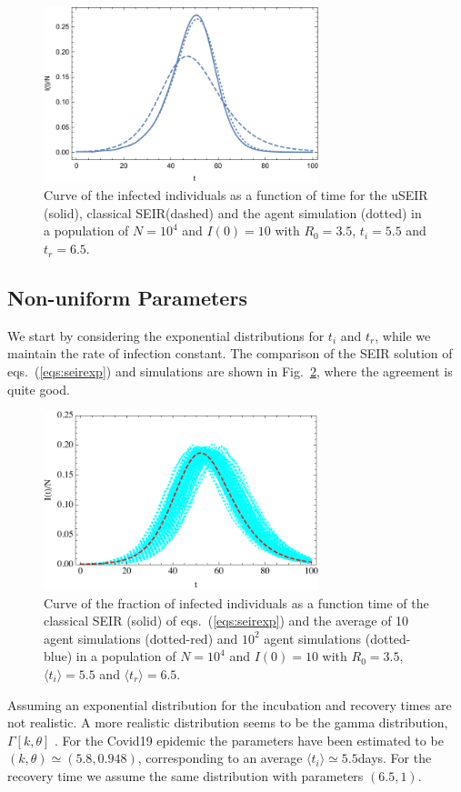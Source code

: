 \documentclass[a4paper,oneside,11pt]{article}
\begin{document}
\begin{figure}[h!]
  \centering
  \includegraphics[width=8cm]{fixed.pdf}
  \caption{ Curve of the infected individuals as a function of time for the uSEIR (solid), classical SEIR(dashed) and the agent simulation (dotted) in a  population of $N=10^4$ and $I(0)=10$ with $R_0=3.5$, $t_i=5.5$ and $t_r=6.5$.  }
  \label{fig:fixed}
   \end{figure}  

\subsection{Non-uniform Parameters}

We start by considering the exponential distributions for $t_i$ and $t_r$, while we maintain the rate of infection constant. The comparison of the SEIR solution of eqs.~(\ref{eqs:seirexp}) and simulations are shown in Fig.~\ref{fig:exp}, where the agreement is quite good. 
\begin{figure}[h!]
  \centering
  \includegraphics[width=8cm]{expseir.pdf}
  \caption{ Curve of the fraction of infected individuals as a function time of the classical SEIR (solid) of eqs.~(\ref{eqs:seirexp}) and the average of 10 agent simulations (dotted-red) and $10^2$ agent simulations (dotted-blue) 
  in a  population of $N=10^4$ and $I(0)=10$ with $R_0=3.5$, $\langle t_i\rangle=5.5$ and $\langle t_r\rangle=6.5$.  }
  \label{fig:exp}
   \end{figure}  
    Assuming an exponential distribution for the incubation and recovery times are not realistic. A more realistic distribution seems to be the  gamma distribution, $\Gamma[k,\theta]$ \cite{}. For the Covid19 epidemic the parameters have been estimated to be $(k,\theta) \simeq (5.8, 0.948)$, corresponding to an average $\langle t_i\rangle \simeq 5.5$days. For the recovery time we assume the same distribution with parameters $(6.5,1)$.
\end{document}

